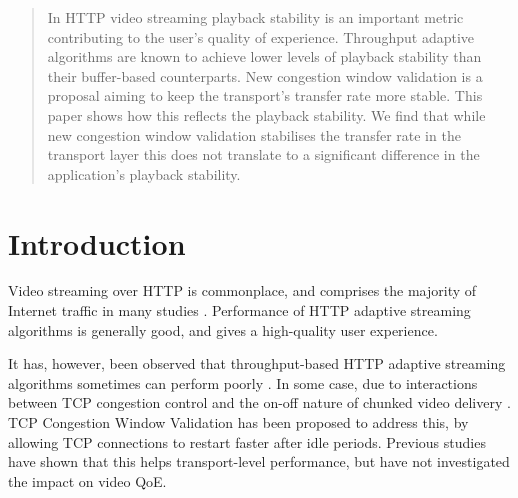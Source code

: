 \documentclass[10pt,sigconf]{acmart}
\newcommand{\maketitleSTD}{}
\newcommand{\maketitleACM}{\maketitle}
\newcommand{\maketitleSTD}{\maketitle}
\newcommand{\maketitleACM}{}
\begin{document}

\maketitleSTD
\begin{abstract}

In HTTP video streaming playback stability is an important metric contributing to the user's quality of experience. Throughput adaptive algorithms are known to achieve lower levels of playback stability than their buffer-based counterparts. New congestion window validation is a proposal aiming to keep the transport's transfer rate more stable. This paper shows how this reflects the playback stability. We find that while new congestion window validation stabilises the transfer rate in the transport layer this does not translate to a significant difference in the application's playback stability. 

\end{abstract}
\maketitleACM


\section{Introduction}
\label{sec:introduction}

%


Video streaming over HTTP is commonplace, and comprises the majority of Internet traffic in many studies \cite{Sandvine-2019-global-internet-report}. Performance of HTTP adaptive streaming algorithms is generally good, and gives a high-quality user experience.
  
It has, however, been observed that throughput-based HTTP adaptive streaming algorithms sometimes can perform poorly \cite{Spiteri-2016-BOLA}. In some case, due to interactions between TCP congestion control and the on-off nature of chunked video delivery \cite{Akhshabi-2012-http-adaptive-players-compete,Stohr-2017-where-are-the-sweet-spots-maci}. TCP Congestion Window Validation \cite{rfc7661-2015-fairhurst-new-cwnd-validation, rfc2861-2000-padhye-congestion-window-validation} has been proposed to address this, by allowing TCP connections to restart faster after idle periods. Previous studies \cite{Nazir-2014-performance-evaluation-congestion-window-validation-dash-newcwv} have shown that this helps transport-level performance, but have not investigated the impact on video QoE. 
\end{document}
